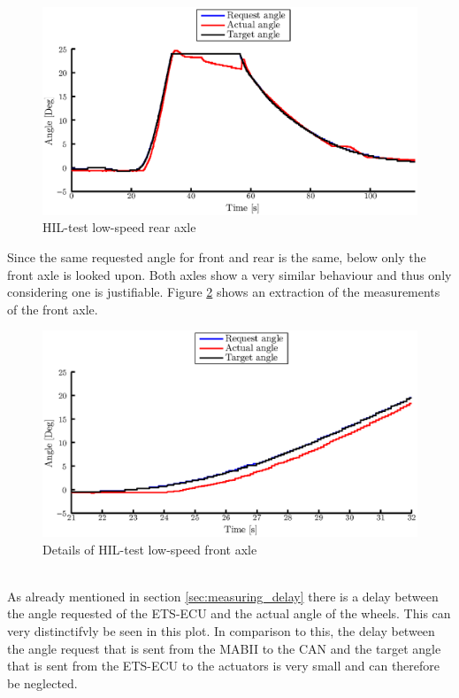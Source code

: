 \documentclass[ExampleMasters.tex]{subfiles}
\begin{document}
\begin{figure}[!htb]
	\centering
	\includegraphics[width=1\linewidth]{figures/HIL002_rear}
	\caption{HIL-test low-speed rear axle}
	
	\label{fig:HIL002_rear}
\end{figure}
Since the same requested angle for front and rear is the same, below only the front axle is looked upon. Both axles show a very similar behaviour and thus only considering one is justifiable.
Figure \ref{fig:HIL002_front_closeup} shows an extraction of the measurements of the front axle. 
\begin{figure}[!htb]
	\centering
	\includegraphics[width=1\linewidth]{figures/HIL002_front_closeup}
	\caption{Details of HIL-test low-speed front axle}
	
	\label{fig:HIL002_front_closeup}
\end{figure} \\
As already mentioned in section \ref{sec:measuring_delay} there is a delay between the angle requested of the \gls{ETS}-\gls{ECU} and the actual angle of the wheels. This can very distinctifvly be seen in this plot. In comparison to this, the delay between the angle request that is sent from the \gls{MABII} to the \gls{CAN} and the target angle that is sent from the \gls{ETS}-\gls{ECU} to the actuators is very small and can therefore be neglected.\\
\end{document}

